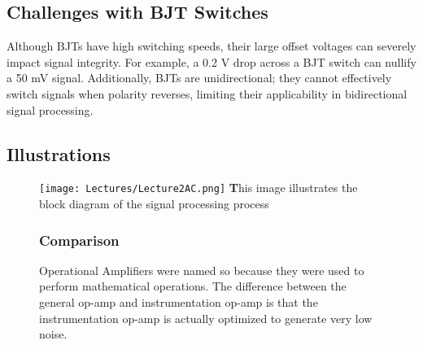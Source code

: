 \documentclass[a4paper,9pt,twoside,openany,twocolumn]{memoir}
\begin{document}
\subsection{Challenges with BJT Switches}
Although BJTs have high switching speeds, their large offset voltages can severely impact signal integrity. For example, a 0.2 V drop across a BJT switch can nullify a 50 mV signal. Additionally, BJTs are unidirectional; they cannot effectively switch signals when polarity reverses, limiting their applicability in bidirectional signal processing.
\subsection{Illustrations}
\begin{figure}[H]  %
    \begin{minipage}[b]{0.5\textwidth}  %
        \begin{tcolorbox}[width=\textwidth, colback=white, boxrule=0.5mm, colframe=black, rounded corners]

            \texttt{[image: Lectures/Lecture2AC.png]}  %
            {\footnotesize \textbf This image illustrates the block diagram of the signal processing process}
        \end{tcolorbox}
    \end{minipage}%
    \hfill  %
    \begin{minipage}[b]{0.5\textwidth}  %
        \small
        \subsubsection*{Comparison}
Operational Amplifiers were named so because they were used to perform mathematical operations.
The difference between the general op-amp and instrumentation op-amp is that the instrumentation op-amp is actually optimized to generate very low noise.

    \end{minipage}
\end{figure}
\end{document}
